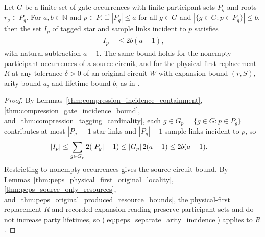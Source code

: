 \begin{lemma}
    \label{thm:peps_separate_arity_incidence}
    \leanok
    Let $G$ be a finite set of gate occurrences with finite participant sets
    $P_g$ and roots $r_g\in P_g$. For $a,b\in\mathbb N$ and $p\in P$, if
    $|P_g|\le a$ for all $g\in G$ and $|\{g\in G:p\in P_g\}|\le b$, then the
    set $I_p$ of tagged star and sample links incident to $p$ satisfies
    \begin{align}
        |I_p| & \le2b(a-1),
        \label{eq:peps_separate_arity_incidence}
    \end{align}
    with natural subtraction $a-1$. The same bound holds for the nonempty-participant
    occurrences of a source circuit, and for the physical-first replacement $R$
    at any tolerance $\delta>0$ of an original circuit $W$ with expansion bound
    $(r,S)$, arity bound $a$, and lifetime bound $b$, as in
    \cite[Theorem~5.2]{OpenAI2026PolynomialPEPS}.
\end{lemma}
\begin{proof}\leanok
    By Lemmas~\ref{thm:compression_incidence_containment},
    \ref{thm:compression_gate_incidence_bound}, and~\ref{thm:compression_tagging_cardinality},
    each $g\in G_p=\{g\in G:p\in P_g\}$ contributes at most $|P_g|-1$ star links
    and $|P_g|-1$ sample links incident to $p$, so
    \begin{align}
        |I_p| & \le\sum_{g\in G_p}2(|P_g|-1)
        \le |G_p|\,2(a-1)\le2b(a-1).\notag
    \end{align}
    Restricting to nonempty occurrences gives the source-circuit bound. By
    Lemmas~\ref{thm:peps_physical_first_original_locality},
    \ref{thm:peps_source_only_resources},
    and~\ref{thm:peps_original_produced_resource_bounds}, the physical-first
    replacement $R$ and recorded-expansion reading preserve participant sets and
    do not increase party lifetimes, so (\ref{eq:peps_separate_arity_incidence})
    applies to $R$.
\end{proof}

